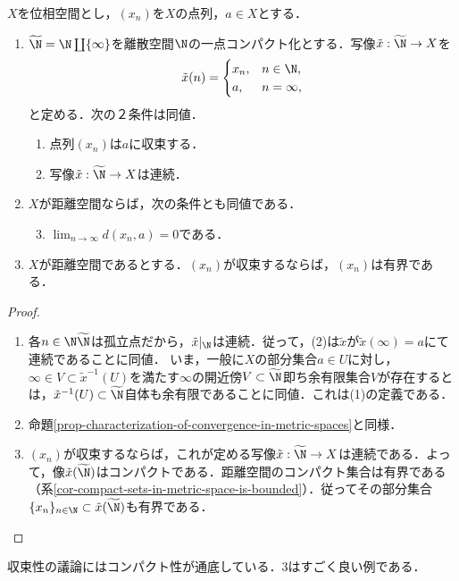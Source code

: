 \documentclass[uplatex,dvipdfmx]{jsreport}
\begin{document}
\begin{proposition}[収束の特徴付け]\label{prop-characterization-of-convergence-in-terms-of-continuousness}
    $X$を位相空間とし，$(x_n)$を$X$の点列，$a\in X$とする．
    \begin{enumerate}
        \item $\widetilde{\N}=\N\coprod\{\infty\}$を離散空間$\N$の一点コンパクト化とする．写像$\tilde{x}:\widetilde{\N}\to X$を\[\tilde{x}(n)=\begin{cases}
            x_n,&n\in\N,\\a,&n=\infty,
        \end{cases}\]と定める．次の２条件は同値．
        \begin{enumerate}[(1)]
            \item 点列$(x_n)$は$a$に収束する．
            \item 写像$\tilde{x}:\widetilde{\N}\to X$は連続．
        \end{enumerate}
        \item $X$が距離空間ならば，次の条件とも同値である．
        \begin{enumerate}[(1)]\setcounter{enumii}{2}
            \item $\lim_{n\to\infty}d(x_n,a)=0$である．
        \end{enumerate}
        \item $X$が距離空間であるとする．$(x_n)$が収束するならば，$(x_n)$は有界である．
    \end{enumerate}
\end{proposition}
\begin{proof}\mbox{}
    \begin{enumerate}
        \item 各$n\in\N\widetilde{\N}$は孤立点だから，$\tilde{x}|_{\N}$は連続．従って，(2)は$\tilde{x}$が$\tilde{x}(\infty)=a$にて連続であることに同値．
        いま，一般に$X$の部分集合$a\in U$に対し，$\infty\in V\subset\tilde{x}^{-1}(U)$を満たす$\infty$の開近傍$V\subset\widetilde{\N}$即ち余有限集合$V$が存在するとは，$\tilde{x}^{-1}(U)\subset\widetilde{\N}$自体も余有限であることに同値．これは(1)の定義である．
        \item 命題\ref{prop-characterization-of-convergence-in-metric-spaces}と同様．
        \item $(x_n)$が収束するならば，これが定める写像$\tilde{x}:\widetilde{\N}\to X$は連続である．よって，像$\tilde{x}(\widetilde{\N})$はコンパクトである．距離空間のコンパクト集合は有界である（系\ref{cor-compact-sets-in-metric-space-is-bounded}）．従ってその部分集合$\{x_n\}_{n\in\N}\subset\tilde{x}(\widetilde{\N})$も有界である．
    \end{enumerate}
\end{proof}
\begin{remarks}
    収束性の議論にはコンパクト性が通底している．3はすごく良い例である．
\end{remarks}
\end{document}
